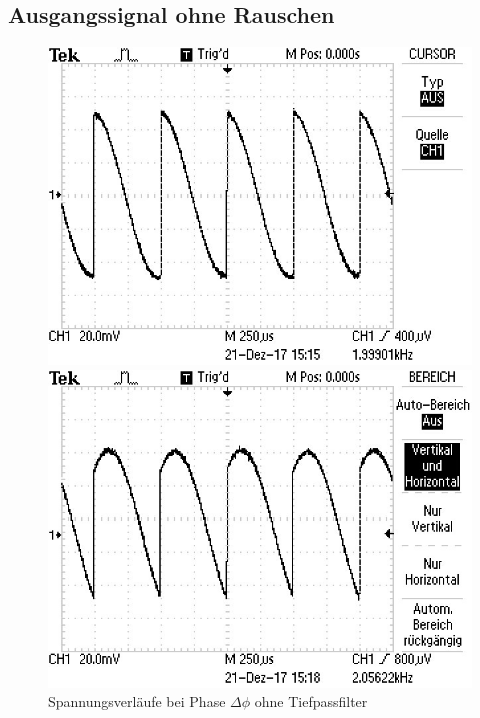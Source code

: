 \subsection{Ausgangssignal ohne Rauschen}
\begin{figure}
\centering
\caption{Spannungsverläufe bei Phase $\Delta\phi$ ohne Tiefpassfilter}
\begin{minipage}{0.48\textwidth}
\includegraphics[scale=0.6]{content/images/00.jpg}
\end{minipage}
\begin{minipage}{0.48\textwidth}
\includegraphics[scale=0.6]{content/images/45.jpg}
\end{minipage}

\end{figure}
